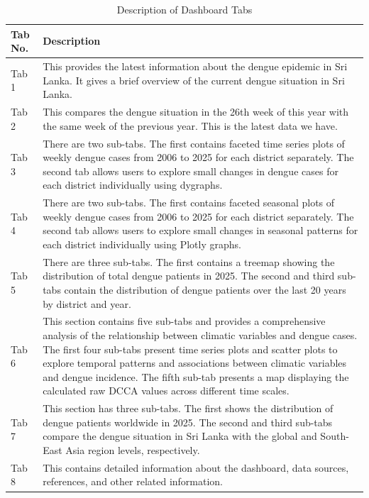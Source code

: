 \documentclass[
  letterpaper,
  DIV=11,
  numbers=noendperiod]{scrartcl}
\begin{document}
\begin{table}[H]
\centering
\caption{Description of Dashboard Tabs}
\begin{tabularx}{\textwidth}{|p{2cm}|X|}
\hline
\textbf{Tab No.} & \textbf{Description} \\
\hline
Tab 1 & This provides the latest information about the dengue epidemic in Sri Lanka. It gives a brief overview of the current dengue situation in Sri Lanka. \\
\hline
Tab 2 & This compares the dengue situation in the 26th week of this year with the same week of the previous year. This is the latest data we have. \\
\hline
Tab 3 & There are two sub-tabs. The first contains faceted time series plots of weekly dengue cases from 2006 to 2025 for each district separately. The second tab allows users to explore small changes in dengue cases for each district individually using dygraphs. \\
\hline
Tab 4 & There are two sub-tabs. The first contains faceted seasonal plots of weekly dengue cases from 2006 to 2025 for each district separately. The second tab allows users to explore small changes in seasonal patterns for each district individually using Plotly graphs. \\
\hline
Tab 5 & There are three sub-tabs. The first contains a treemap showing the distribution of total dengue patients in 2025. The second and third sub-tabs contain the distribution of dengue patients over the last 20 years by district and year.   \\
\hline
Tab 6 & This section contains five sub-tabs and provides a comprehensive analysis of the relationship between climatic variables and dengue cases. The first four sub-tabs present time series plots and scatter plots to explore temporal patterns and associations between climatic variables and dengue incidence. The fifth sub-tab presents a map displaying the calculated raw DCCA values across different time scales.\\
\hline
Tab 7 & This section has three sub-tabs. The first shows the distribution of dengue patients worldwide in 2025. The second and third sub-tabs compare the dengue situation in Sri Lanka with the global and South-East Asia region levels, respectively. \\
\hline
Tab 8 & This contains detailed information about the dashboard, data sources, references, and other related information. \\
\hline
\end{tabularx}
\end{table}
\end{document}
